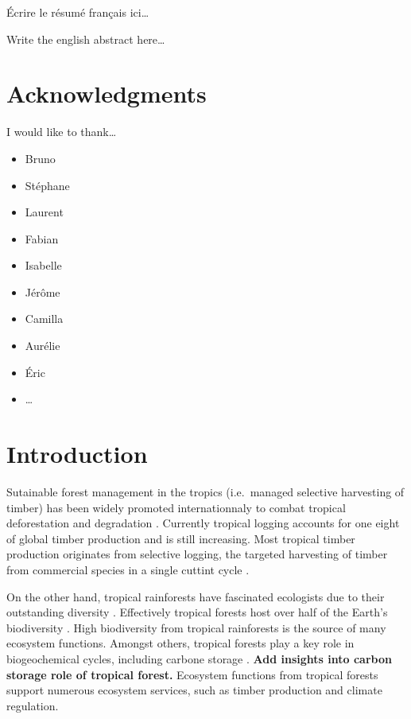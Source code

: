 \documentclass[12pt,]{article}
\providecommand{\tightlist}{%
\setlength{\itemsep}{0pt}\setlength{\parskip}{0pt}}
\let\oldsection\section
\renewcommand\section{\newpage\oldsection}
\theoremstyle{definition}
\theoremstyle{definition}
\theoremstyle{remark}
\begin{document}
Écrire le résumé français ici\ldots{}

Write the english abstract here\ldots{}

\section*{Acknowledgments}\label{acknowledgments}

I would like to thank\ldots{}

\begin{itemize}
\tightlist
\item
  Bruno
\item
  Stéphane
\item
  Laurent
\item
  Fabian
\item
  Isabelle
\item
  Jérôme
\item
  Camilla
\item
  Aurélie
\item
  Éric
\item
  \ldots{}
\end{itemize}

\section*{Introduction}\label{introduction}

Sutainable forest management in the tropics (i.e.~managed selective
harvesting of timber) has been widely promoted internationnaly to combat
tropical deforestation and degradation \citep{Zimmerman2012}. Currently
tropical logging accounts for one eight of global timber production
\citep{Blaser2011} and is still increasing. Most tropical timber
production originates from selective logging, the targeted harvesting of
timber from commercial species in a single cuttint cycle
\citep{Martin2015}.

On the other hand, tropical rainforests have fascinated ecologists due
to their outstanding diversity \citep{connell_diversity_1978}.
Effectively tropical forests host over half of the Earth's biodiversity
\citep{Scheffers2012}. High biodiversity from tropical rainforests is
the source of many ecosystem functions. Amongst others, tropical forests
play a key role in biogeochemical cycles, including carbone storage
\citep{Lewis2004}. \textbf{Add insights into carbon storage role of
tropical forest.} Ecosystem functions from tropical forests support
numerous ecosystem services, such as timber production and climate
regulation.
\end{document}
